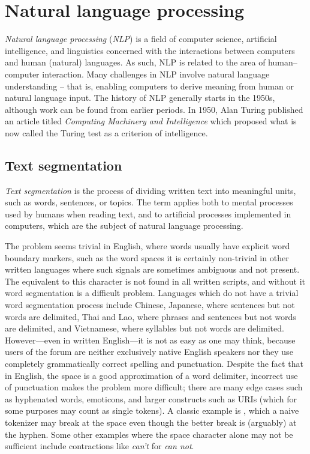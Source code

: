 \section{Natural language processing}

  \emph{Natural language processing} (\emph{NLP}) is a field of computer science, artificial intelligence, and linguistics concerned with the interactions between computers and human (natural) languages. As such, NLP is related to the area of human–computer interaction. Many challenges in NLP involve natural language understanding -- that is, enabling computers to derive meaning from human or natural language input. The history of NLP generally starts in the 1950s, although work can be found from earlier periods. In 1950, Alan Turing published an article titled \emph{Computing Machinery and Intelligence} which proposed what is now called the Turing test as a criterion of intelligence\cite{Turing1950}.

  \subsection{Text segmentation}

    \emph{Text segmentation} is the process of dividing written text into meaningful units, such as words, sentences, or topics. The term applies both to mental processes used by humans when reading text, and to artificial processes implemented in computers, which are the subject of natural language processing. 
      
    The problem seems trivial in English, where words usually have explicit word boundary markers, such as the word spaces it is certainly non-trivial in other written languages where such signals are sometimes ambiguous and not present. The equivalent to this character is not found in all written scripts, and without it word segmentation is a difficult problem. Languages which do not have a trivial word segmentation process include Chinese, Japanese, where sentences but not words are delimited, Thai and Lao, where phrases and sentences but not words are delimited, and Vietnamese, where syllables but not words are delimited. However---even in written English---it is not as easy as one may think, because users of the forum are neither exclusively native English speakers nor they use completely grammatically correct spelling and punctuation. Despite the fact that in English, the space is a good approximation of a word delimiter, incorrect use of punctuation makes the problem more difficult; there are many edge cases such as hyphenated words, emoticons, and larger constructs such as URIs (which for some purposes may count as single tokens). A classic example is , which a naive tokenizer may break at the space even though the better break is (arguably) at the hyphen. Some other examples where the space character alone may not be sufficient include contractions like \emph{can't} for \emph{can not}.
      

